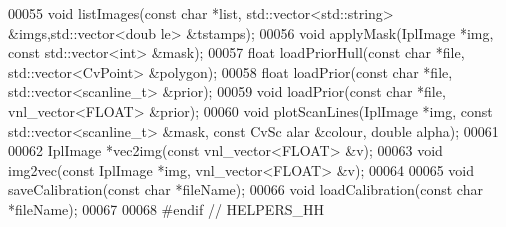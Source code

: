 \begin{DoxyCode}
00055 \textcolor{keywordtype}{void} listImages(\textcolor{keyword}{const} \textcolor{keywordtype}{char} *list, std::vector<std::string> &imgs,std::vector<doub
      le> &tstamps);
00056 \textcolor{keywordtype}{void} applyMask(IplImage *img, \textcolor{keyword}{const} std::vector<int> &mask);
00057 \textcolor{keywordtype}{float} loadPriorHull(\textcolor{keyword}{const} \textcolor{keywordtype}{char} *file, std::vector<CvPoint> &polygon);
00058 \textcolor{keywordtype}{float} loadPrior(\textcolor{keyword}{const} \textcolor{keywordtype}{char} *file, std::vector<scanline\_t> &prior);
00059 \textcolor{keywordtype}{void} loadPrior(\textcolor{keyword}{const} \textcolor{keywordtype}{char} *file, vnl\_vector<FLOAT> &prior);
00060 \textcolor{keywordtype}{void} plotScanLines(IplImage *img, \textcolor{keyword}{const} std::vector<scanline\_t> &mask, \textcolor{keyword}{const} CvSc
      alar &colour, \textcolor{keywordtype}{double} alpha);
00061 
00062 IplImage *vec2img(\textcolor{keyword}{const} vnl\_vector<FLOAT> &v);
00063 \textcolor{keywordtype}{void} img2vec(\textcolor{keyword}{const} IplImage *img, vnl\_vector<FLOAT> &v);
00064 
00065 \textcolor{keywordtype}{void} saveCalibration(\textcolor{keyword}{const} \textcolor{keywordtype}{char} *fileName);
00066 \textcolor{keywordtype}{void} loadCalibration(\textcolor{keyword}{const} \textcolor{keywordtype}{char} *fileName);
00067 
00068 \textcolor{preprocessor}{#endif  // HELPERS\_HH}
\end{DoxyCode}
